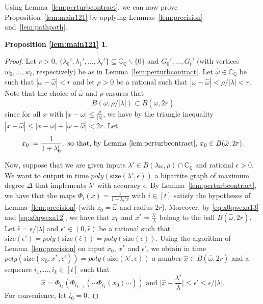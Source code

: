 \documentclass[11pt]{article}
\newtheorem*{lemmainonetwoone}{Proposition \ref{lem:main121}}
\def\CQ{\mathbb{C}_{\mathbb{Q}}}
\newcommand{\size}[1]{\mathrm{size}(#1)}
\newcommand{\eps}{\epsilon}
\begin{document}
Using Lemma~\ref{lem:perturbcontract}, we can now prove  Proposition~\ref{lem:main121} by applying Lemmas~\ref{lem:precision} and~\ref{lem:pathpath}.
\begin{lemmainonetwoone}
\statelemmainonetwoone
\end{lemmainonetwoone}
\begin{proof}
Let $r>0$, $\{\lambda_0',\lambda_1',\hdots,\lambda_t'\}\subseteq \CQ\backslash\{0\}$ and $G_0',\hdots,G_t'$ (with vertices $w_0,\hdots,w_t$, respectively)  be as in Lemma~\ref{lem:perturbcontract}.  Let $\hat{\omega}\in \CQ$ be such that $|\omega-\hat{\omega}|< r$ and let $\rho>0$ be a rational such that $|\omega-\hat{\omega}|<\rho/|\lambda|<r$. Note that the choice of $\hat{\omega}$ and  $\rho$ ensures that 
\begin{equation}\label{eq:x0qwexa13}
B(\omega,\rho/|\lambda|)\subset B(\hat{\omega},2r)
\end{equation}
since for all $x$ with $|x-\omega|\leq \frac{\rho}{|\lambda|}$, we have by the triangle inequality $|x-\hat{\omega}|\leq |x-\omega|+|\omega-\hat{\omega}|< 2r$. Let 
\begin{equation}\label{eq:x0qwexa12}
x_0:=\frac{1}{1+\lambda_{0}'}, \mbox{ so that, by Lemma~\ref{lem:perturbcontract}, } x_0\in B(\hat{\omega},2r).
\end{equation}

Now, suppose that we are given inputs $\lambda'\in B(\lambda \omega,\rho)\cap \CQ$ and rational $\eps>0$.  We want to output in time $poly(\size{\lambda',\epsilon})$ a bipartite graph of maximum degree $\Delta$ that implements $\lambda'$ with accuracy $\epsilon$. By Lemma~\ref{lem:perturbcontract}, we have that the maps $\Phi_i(x)=\frac{1}{1+\lambda_i'x}$ with $i\in[t]$ satisfy the hypotheses of Lemma~\ref{lem:precision} (with $z_0=\hat{\omega}$ and radius $2r$). Moreover, by \eqref{eq:x0qwexa13} and \eqref{eq:x0qwexa12}, we have that $x_0$ and $x^*=\frac{\lambda'}{\lambda}$ belong to the ball $B(\hat{\omega},2r)$. Let $\hat{\epsilon}=\epsilon/|\lambda|$ and $\epsilon'\in (0,\hat{\epsilon})$ be a rational such that $\size{\epsilon'}=poly(\size{\hat{\epsilon}})=poly(\size{\epsilon})$. Using the algorithm of Lemma~\ref{lem:precision} on input $x_0$, $x^*$ and $\epsilon'$, we obtain in time $poly(\size{x_0,x^*,\eps'})=poly(\size{\lambda',\eps})$ a number $\hat{x}\in B(\hat{\omega},2r)$ and a sequence $i_1,\hdots,i_k\in[t]$ such that 
\begin{equation}\label{eq:mg5gm54}
\hat{x}=\Phi_{i_k}(\Phi_{i_{k-1}}(\cdots\Phi_{i_1}(x_0)\cdots))\mbox{ and }\Big|\hat{x}-\frac{\lambda'}{\lambda}\Big|\leq \epsilon'\leq\epsilon/|\lambda|.
\end{equation}
For convenience, let $i_0=0$.


\end{proof}
\end{document}
